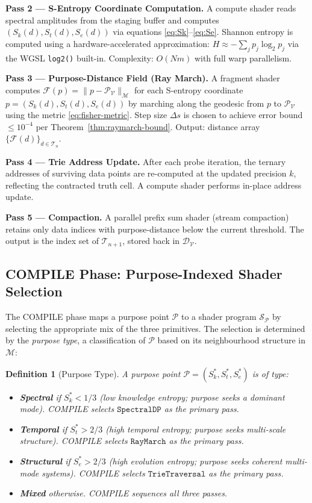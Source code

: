 \documentclass[10pt,twocolumn]{article}
\newtheorem{definition}[theorem]{Definition}
\newcommand{\TruthCell}{\mathcal{T}}
\newcommand{\PurposePoint}{\mathcal{P}}
\newcommand{\DataSpace}{\mathcal{D}}
\newcommand{\ManifoldM}{\mathcal{M}}
\begin{document}
\textbf{Pass 2 --- S-Entropy Coordinate Computation.}
A compute shader reads spectral amplitudes from the staging buffer and
computes $(S_k(d), S_t(d), S_e(d))$ via equations \eqref{eq:Sk}--\eqref{eq:Se}.
Shannon entropy is computed using a hardware-accelerated approximation:
$H \approx -\sum_j p_j \log_2 p_j$ via the WGSL \texttt{log2()} built-in.
Complexity: $O(Nm)$ with full warp parallelism.

\textbf{Pass 3 --- Purpose-Distance Field (Ray March).}
A fragment shader computes $\mathcal{F}(p) = \|p - \PurposePoint_\mathcal{V}\|_\ManifoldM$
for each S-entropy coordinate $p = (S_k(d), S_t(d), S_e(d))$ by marching
along the geodesic from $p$ to $\PurposePoint_\mathcal{V}$
using the metric \eqref{eq:fisher-metric}.
Step size $\Delta s$ is chosen to achieve error bound $\leq 10^{-4}$
per Theorem~\ref{thm:raymarch-bound}.
Output: distance array $\{\mathcal{F}(d)\}_{d \in \TruthCell_n}$.

\textbf{Pass 4 --- Trie Address Update.}
After each probe iteration, the ternary addresses of surviving data points
are re-computed at the updated precision $k$, reflecting the contracted
truth cell. A compute shader performs in-place address update.

\textbf{Pass 5 --- Compaction.}
A parallel prefix sum shader (stream compaction) retains only data indices
with purpose-distance below the current threshold.
The output is the index set of $\TruthCell_{n+1}$, stored
back in $\DataSpace_\mathcal{V}$.

\subsection{COMPILE Phase: Purpose-Indexed Shader Selection}

The COMPILE phase maps a purpose point $\PurposePoint$ to a shader program
$\mathcal{S}_\PurposePoint$ by selecting the appropriate mix of the three
primitives. The selection is determined by the \emph{purpose type},
a classification of $\PurposePoint$ based on its neighbourhood structure
in $\ManifoldM$:

\begin{definition}[Purpose Type]
\label{def:purpose-type}
A purpose point $\PurposePoint = (S_k^*, S_t^*, S_e^*)$ is of type:
\begin{itemize}
\item \textbf{Spectral} if $S_k^* < 1/3$ (low knowledge entropy; purpose seeks a dominant mode). COMPILE selects $\mathtt{SpectralDP}$ as the primary pass.
\item \textbf{Temporal} if $S_t^* > 2/3$ (high temporal entropy; purpose seeks multi-scale structure). COMPILE selects $\mathtt{RayMarch}$ as the primary pass.
\item \textbf{Structural} if $S_e^* > 2/3$ (high evolution entropy; purpose seeks coherent multi-mode systems). COMPILE selects $\mathtt{TrieTraversal}$ as the primary pass.
\item \textbf{Mixed} otherwise. COMPILE sequences all three passes.
\end{itemize}
\end{definition}
\end{document}
